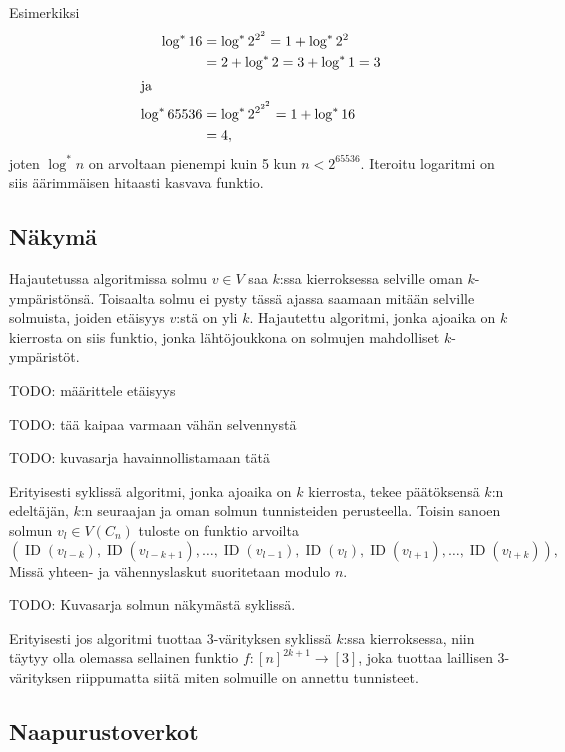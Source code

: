 \documentclass[finnish]{tktltiki2}
\theoremstyle{definition}
\theoremstyle{remark}
\DeclareMathOperator{\id}{ID}
\begin{document}
Esimerkiksi
%
\begin{align*}
    \log^* 16 &= \log^* 2^{2^2} = 1 + \log^* 2^2 \\
              &= 2+ \log^* 2 = 3 + \log^* 1 = 3 \\
\intertext{ja}
    \log^* 65536 &= \log^* 2^{2^{2^2}} = 1 + \log^* 16 \\
                 &= 4,
\end{align*}
%
joten $\log^* n$ on arvoltaan pienempi kuin 5 kun $n < 2^{65536}$. Iteroitu
logaritmi on siis äärimmäisen hitaasti kasvava funktio.

\subsection{Näkymä}

Hajautetussa algoritmissa solmu $v \in V$ saa $k$:ssa kierroksessa selville
oman $k$-ympäristönsä. Toisaalta solmu ei pysty tässä ajassa saamaan mitään
selville solmuista, joiden etäisyys $v$:stä on yli $k$. Hajautettu algoritmi,
jonka ajoaika on $k$ kierrosta on siis funktio, jonka lähtöjoukkona on solmujen
mahdolliset $k$-ympäristöt.

TODO: määrittele etäisyys

TODO: tää kaipaa varmaan vähän selvennystä

TODO: kuvasarja havainnollistamaan tätä

Erityisesti syklissä algoritmi, jonka ajoaika on $k$ kierrosta, tekee
päätöksensä $k$:n edeltäjän, $k$:n seuraajan ja oman solmun tunnisteiden
perusteella. Toisin sanoen solmun $v_l \in V(C_n)$ tuloste on funktio arvoilta
%
\begin{equation*}
    \left(
        \id(v_{l-k}), \id(v_{l-k+1}), \dots,
        \id(v_{l-1}), \id(v_l), \id(v_{l+1}), \dots, \id(v_{l+k})
    \right),
\end{equation*}
%
Missä yhteen- ja vähennyslaskut suoritetaan modulo $n$.

TODO: Kuvasarja solmun näkymästä syklissä.

Erityisesti jos algoritmi tuottaa 3-värityksen syklissä $k$:ssa kierroksessa,
niin täytyy olla olemassa sellainen funktio $f: [n]^{2k+1} \to [3]$, joka
tuottaa laillisen 3-värityksen riippumatta siitä miten solmuille on annettu
tunnisteet.

\subsection{Naapurustoverkot}
\end{document}
